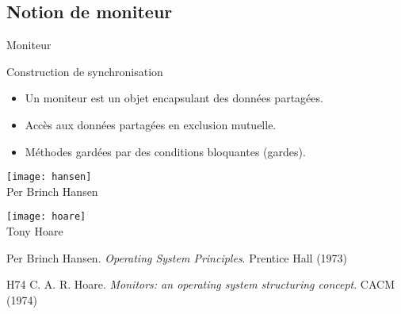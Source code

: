 \subsection{Notion de moniteur}

\begin{frame}{Moniteur}

  \vFill
  \begin{block}{Construction de synchronisation}
    \begin{itemize}
    \item Un moniteur est un objet encapsulant des données partagées.
    \item Accès aux données partagées en exclusion mutuelle.
    \item Méthodes gardées par des conditions bloquantes (gardes).
    \end{itemize}
  \end{block}

  \vFill
  \hFill
  \begin{minipage}{.4\textwidth}
    \begin{center}
      \texttt{[image: hansen]}\\
      Per Brinch Hansen
    \end{center}
  \end{minipage}
  \hFill
  \begin{minipage}{.5\textwidth}
    \begin{center}
      \texttt{[image: hoare]}\\
      Tony Hoare
    \end{center}
  \end{minipage}
  \hFill

  \vFill
  \begin{citing}
  \item[] Per Brinch Hansen. \textit{Operating System Principles}. Prentice Hall (1973)
  \item[H74] C. A. R. Hoare. \textit{Monitors: an operating system structuring concept}. CACM (1974)
  \end{citing}
\end{frame}


